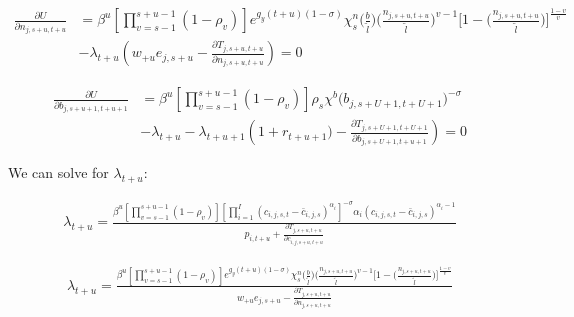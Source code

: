 \documentclass[letterpaper,11pt]{article}
\theoremstyle{definition}
\begin{document}
\begin{equation}\label{Eqnfoc}
  \begin{split}
  \frac{\partial U}{\partial n_{j,s+u,t+u}} & = \beta^u\left[\prod_{v=s-1}^{s+u-1}(1-\rho_v)\right] e^{g_y (t+u)(1-\sigma)}\chi^n_{s}\biggl(\frac{b}{\tilde{l}}\biggr)\biggl(\frac{n_{j,s+u,t+u}}{\tilde{l}}\biggr)^{v-1}\Biggl[1 - \biggl(\frac{n_{j,s+u,t+u}}{\tilde{l}}\biggr)\Biggr]^{\frac{1-v}{v}} \\
  & - \lambda_{t+u} \left( w_{+u} e_{j,s+u} - \frac{\partial T_{j,s+u,t+u}}{\partial n_{j,s+u,t+u}} \right)= 0
    \end{split}
\end{equation}

\begin{equation}\label{Eqbfoc}
  \begin{split}
  \frac{\partial U}{\partial b_{j,s+u+1,t+u+1}} & = \beta^u\left[\prod_{v=s-1}^{s+u-1}(1-\rho_v)\right] \rho_s\chi^b\bigl(b_{j,s+U+1,t+U+1}\bigr)^{-\sigma} \\
  & - \lambda_{t+u} - \lambda_{t+u+1} \left( 1 + r_{t+u+1}) - \frac{\partial T_{j,s+U+1,t+U+1}}{\partial b_{j,s+U+1,t+u+1}} \right)= 0
  \end{split}
\end{equation}

We can solve for $\lambda_{t+u}$:

\begin{equation}
  \begin{split}
  \lambda_{t+u} = \frac{ \beta^u\left[\prod_{v=s-1}^{s+u-1}(1-\rho_v)\right] \left[ \prod_{i=1}^I \left( c_{i,j,s,t} - \bar c_{i,j,s} \right) ^{\alpha_i} \right]^{-\sigma}\alpha_i \left( c_{i,j,s,t} - \bar c_{i,j,s} \right)^{\alpha_i-1} } { p_{i,t+u} + \frac{\partial T_{j,s+u,t+u}}{\partial c_{i,j,s+u,t+u}} } \nonumber
  \end{split}
\end{equation}

\begin{equation}
  \begin{split}
  \lambda_{t+u} = \frac{ \beta^u\left[\prod_{v=s-1}^{s+u-1}(1-\rho_v)\right] e^{g_y (t+u)(1-\sigma)}\chi^n_{s}\biggl(\frac{b}{\tilde{l}}\biggr)\biggl(\frac{n_{j,s+u,t+u}}{\tilde{l}}\biggr)^{v-1}\Biggl[1 - \biggl(\frac{n_{j,s+u,t+u}}{\tilde{l}}\biggr)\Biggr]^{\frac{1-v}{v}} } { w_{+u} e_{j,s+u} - \frac{\partial T_{j,s+u,t+u}}{\partial n_{j,s+u,t+u}} }  \nonumber
  \end{split}
\end{equation}
\end{document}
